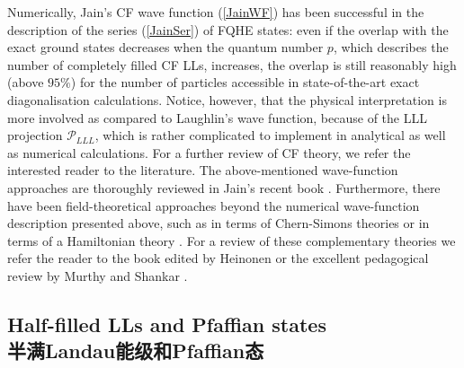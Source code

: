\documentclass[10pt]{book}
\newcommand{\red}{\color{red}}
\newcommand{\Pmath}{\mathcal{P}}
\begin{document}
Numerically, Jain's CF wave function (\ref{JainWF}) has been successful in the description of the series (\ref{JainSer}) of FQHE
states: even if the overlap with the exact ground states decreases when the quantum number $p$, which describes the number
of completely filled CF LLs, increases, the overlap is still reasonably high (above $95\%$) %
for the number of particles accessible in state-of-the-art exact diagonalisation calculations. Notice, however, that the
physical interpretation is more involved as compared to Laughlin's wave function, because of the LLL projection $\Pmath_{LLL}$,
which is rather complicated to implement in analytical as well as numerical calculations. For a further review of CF theory, 
we refer the interested reader to the literature. The above-mentioned wave-function approaches are thoroughly reviewed 
in Jain's recent book \cite{JainBook}. Furthermore, there have been field-theoretical approaches beyond the numerical wave-function
description presented above, such as in terms of Chern-Simons theories \cite{LF,HLR} or in terms of a Hamiltonian theory
\cite{MS}. For a review of these complementary theories we refer the reader to the book edited by Heinonen \cite{Heinonen} or
the excellent pedagogical review by Murthy and Shankar \cite{MS}.



\subsection[半满Landau能级和Pfaffian态]{Half-filled LLs and Pfaffian states\\\bf 半满Landau能级和Pfaffian态}
\end{document}
